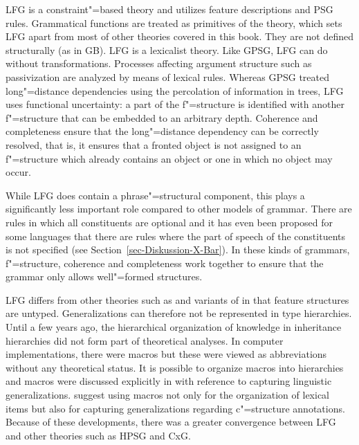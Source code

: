 LFG is a constraint"=based theory and utilizes feature descriptions and PSG rules. Grammatical functions are treated
as primitives of the theory, which sets LFG apart from most of other theories covered in this book. They are not defined structurally (as in GB). LFG is a lexicalist theory. Like GPSG, LFG can do without transformations. Processes affecting
argument structure such as passivization are analyzed by means of lexical rules. Whereas GPSG treated long"=distance dependencies using the percolation of information
in trees, LFG uses functional uncertainty: a part of the f"=structure is identified with another
f"=structure that can be embedded to an arbitrary depth. Coherence and completeness
ensure that the long"=distance dependency can be correctly resolved, that is, it ensures that a fronted object is not assigned to an f"=structure which already contains an object or one
in which no object may occur.

While LFG does contain a phrase"=structural component, this plays a significantly less important role compared to other models of grammar. There are rules in which all constituents are
optional and it has even been proposed for some languages that there are rules where the part of speech of the constituents is not specified (see Section~\ref{sec-Diskussion-X-Bar}).
In these kinds of grammars, f"=structure, coherence and completeness work together to ensure that the grammar only allows well"=formed structures.

LFG differs from other theories such as \hpsg and variants of \cxg in that feature structures are untyped. Generalizations can therefore not be represented in type hierarchies. 
Until a few years ago, the hierarchical organization of knowledge in inheritance hierarchies did not form part of theoretical analyses. In computer implementations,
there were macros but these were viewed as abbreviations without any theoretical status. It is possible to organize macros into hierarchies and macros were discussed explicitly
in  with reference to capturing linguistic generalizations. \citet*{ADT2008a} suggest using macros not only for the organization of lexical items but also for
capturing generalizations regarding c"=structure annotations. Because of these developments, there was a greater convergence between LFG and other theories such as HPSG and CxG.

